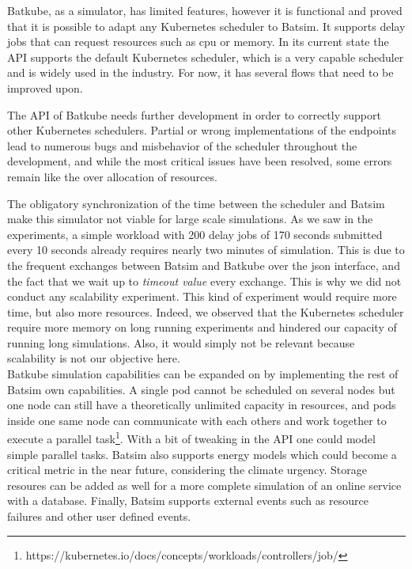 Batkube, as a simulator, has limited features, however it is functional and
proved that it is possible to adapt any Kubernetes scheduler to Batsim. It
supports delay jobs that can request resources such as cpu or memory. In its
current state the API supports the default Kubernetes scheduler, which is  a
very capable scheduler and is widely used in the industry. For now, it has several flows that need to be improved upon.

The API of Batkube needs further development in order to correctly support
other Kubernetes schedulers. Partial or wrong implementations of the endpoints
lead to numerous bugs and misbehavior of the scheduler throughout the
development, and while the most critical issues have been resolved, some errors
remain like the over allocation of resources.

The obligatory synchronization of the time between the scheduler and Batsim
make this simulator not viable for large scale simulations. As we saw in the
experiments, a simple workload with 200 delay jobs of 170 seconds submitted
every 10 seconds already requires nearly two minutes of simulation. This is due
to the frequent exchanges between Batsim and Batkube over the json interface,
and the fact that we wait up to \textit{timeout value} every exchange. This is
why we did not conduct any scalability experiment. This kind of experiment
would require more time, but also more resources. Indeed, we observed that the
Kubernetes scheduler require more memory on long running experiments and
hindered our capacity of running long simulations. Also, it would simply not be
relevant because scalability is not our objective here.\\

Batkube simulation capabilities can be expanded on by implementing the rest of
Batsim own capabilities. A single pod cannot be scheduled on several nodes but
one node can still have a theoretically unlimited capacity in resources, and
pods inside one same node can communicate with each others and work together to
execute a parallel
task\footnote{https://kubernetes.io/docs/concepts/workloads/controllers/job/}.
With a bit of tweaking in the API one could model simple parallel tasks. Batsim
also supports energy models which could become a critical metric in the near
future, considering the climate urgency. Storage resoures can be added as well
for a more complete simulation of an online service with a database. Finally,
Batsim supports external events such as resource failures and other user
defined events.

